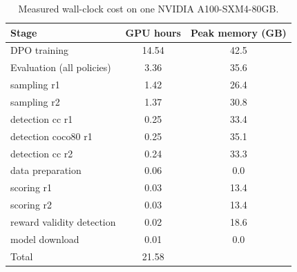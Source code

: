 \begin{table}[t]
\centering
\small
\caption{Measured wall-clock cost on one NVIDIA A100-SXM4-80GB.}
\label{tab:compute}
\begin{tabular}{lcc}
\toprule
Stage & GPU hours & Peak memory (GB) \\
\midrule
DPO training & 14.54 & 42.5 \\
Evaluation (all policies) & 3.36 & 35.6 \\
sampling r1 & 1.42 & 26.4 \\
sampling r2 & 1.37 & 30.8 \\
detection cc r1 & 0.25 & 33.4 \\
detection coco80 r1 & 0.25 & 35.1 \\
detection cc r2 & 0.24 & 33.3 \\
data preparation & 0.06 & 0.0 \\
scoring r1 & 0.03 & 13.4 \\
scoring r2 & 0.03 & 13.4 \\
reward validity detection & 0.02 & 18.6 \\
model download & 0.01 & 0.0 \\
\midrule
Total & 21.58 &  \\
\bottomrule
\end{tabular}
\end{table}
